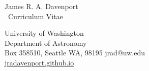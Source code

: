 \documentclass{article}
\begin{document}
\begin{center}


{\LARGE{\sc James R. A. Davenport}}\\
\smallskip
{\large{{ \hrulefill \, {\calligra Curriculum Vitae} \hspace{0.7mm} \,\hrulefill}}}\\
\end{center}
\normalsize
\normalfont


\thispagestyle{empty} %

\addresses
{
University of Washington\\
Department of Astronomy\\
Box 358510, Seattle WA, 98195
}
{ jrad@uw.edu\\
\href{https://jradavenport.github.io}{\color{NavyBlue}jradavenport.github.io}\\
\href{https://github.com/jradavenport/}{\color{NavyBlue}\faGithub} \href{https://twitter.com/jradavenport}{\color{NavyBlue}\faTwitter} \href{http://youtube.com/james-davenport}{\color{NavyBlue}\faYoutube} \href{http://www.linkedin.com/in/jradavenport}{\color{NavyBlue}\faLinkedin}
\normalsize
}
\end{document}
